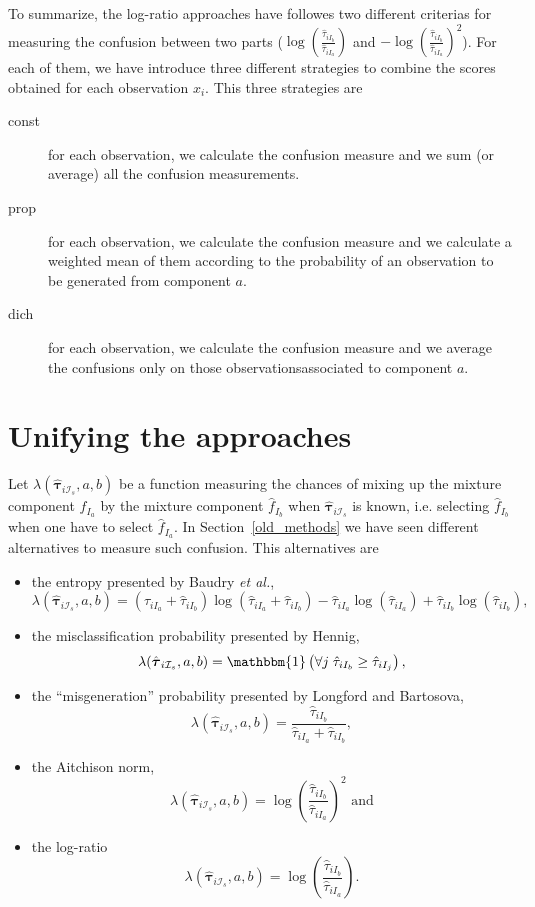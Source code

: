 \documentclass[10pt, a4paper]{article}
\newcommand{\m}[1]{\boldsymbol{#1}}
\begin{document}
To summarize, the log-ratio approaches have followes two different criterias for measuring the confusion between two parts ($\log (\frac{ \hat{\tau}_{iI_b} }{ \hat{\tau}_{iI_a} })$ and $-\log (\frac{ \hat{\tau}_{iI_b} }{ \hat{\tau}_{iI_a} })^2$). For each of them, we have introduce three different strategies to combine the scores obtained for each observation $x_i$. This three strategies are
\begin{description}
\item[const] for each observation, we calculate the confusion measure and we sum (or average) all the confusion measurements.
\item[prop] for each observation, we calculate the confusion measure and we calculate a weighted mean of them according to the probability of an observation to be generated from component $a$.
\item[dich] for each observation, we calculate the confusion measure and we average the confusions only on those observationsassociated to component $a$.
\end{description}




\section{Unifying the approaches}
\label{confusion}

Let $\lambda(\hat{\m \tau}_{i \mathcal{I}_s}, a, b)$ be a function measuring the chances of mixing up the mixture component $\hat{f}_{I_a}$ by the mixture component $\hat{f}_{I_b}$ when $\hat{\m \tau}_{i \mathcal{I}_s}$ is known, i.e. selecting $\hat{f}_{I_b}$ when one have to select $\hat{f}_{I_a}$. In Section~\ref{old_methods} we have seen different alternatives to measure such confusion. This alternatives are

\begin{itemize}
\item the entropy presented by Baudry \emph{et al.}, 
\[\lambda(\hat{\m \tau}_{i \mathcal{I}_s}, a, b) = (\hat{\tau}_{iI_a}+\hat{\tau}_{iI_b}) \log(\hat{\tau}_{iI_a} + \hat{\tau}_{iI_b}) - \hat{\tau}_{iI_a} \log(\hat{\tau}_{iI_a}) + \hat{\tau}_{iI_b} \log(\hat{\tau}_{iI_b}),\]
\item the misclassification probability presented by Hennig, \[\lambda(\hat{\m \tau}_{i \mathcal{I}_s}, a, b) = \mathbbm{1}\left( \forall j\; \hat{\tau}_{i I_{b}} \geq \hat{\tau}_{iI_j} \right),\]
\item the ``misgeneration'' probability presented by Longford and Bartosova, \[\lambda(\hat{\m \tau}_{i \mathcal{I}_s}, a, b) = \frac{\hat{\tau}_{iI_b}}{\hat{\tau}_{iI_a} + \hat{\tau}_{iI_b}},\]
\item the Aitchison norm, \[\lambda(\hat{\m \tau}_{i \mathcal{I}_s}, a, b) = \log (\frac{ \hat{\tau}_{iI_b} }{ \hat{\tau}_{iI_a} })^2 \text{ and}\]
\item the log-ratio \[ \lambda(\hat{\m \tau}_{i \mathcal{I}_s}, a, b) = \log (\frac{ \hat{\tau}_{iI_b} }{ \hat{\tau}_{iI_a} }).\]
\end{itemize}
\end{document}
